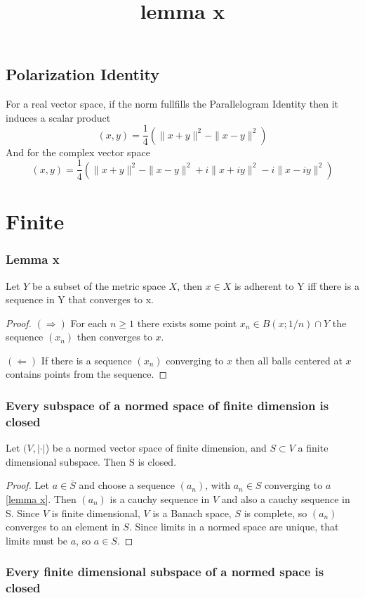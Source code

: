\documentclass[titlepage]{article}
\begin{document}
\subsection{Polarization Identity}
For a real vector space, if the norm fullfills the Parallelogram Identity then it induces a scalar product
\begin{equation}
(x,y) = \frac{1}{4}\left(\|x+y\|^2 - \|x-y\|^2\right)
\label{polreel}
\end{equation}
And for the complex vector space
\begin{equation}
(x,y) = \frac{1}{4}\left(\|x+y\|^2 - \|x-y\|^2 +i\|x+iy\|^2 - i\|x-iy\|^2   \right)
\label{polcomp}
\end{equation}
\section{Finite}
\subsubsection{Lemma x}
Let $Y$ be a subset of the metric space $X$, then $x\in X$ is adherent to Y iff there is a sequence in Y that converges to x.
\begin{proof}
\title{lemma x}
$(\Rightarrow)$ For each $n\geq 1$ there exists some point $x_n \in B(x;1/n)\cap Y$ the sequence $(x_n)$ then converges to $x$.

$(\Leftarrow)$  If there is a sequence $(x_n)$ converging to $x$ then all balls centered at $x$ contains points from the sequence.
\end{proof}
\subsubsection{Every subspace of a normed space of finite dimension is closed}
Let $(V, |\cdot|$) be a normed vector space of finite dimension, and $S\subset V$ a finite dimensional subspace. Then S is closed.
\begin{proof}
Let $a\in \overline{S}$ and choose a sequence $(a_n)$, with $a_n \in S$ converging to $a$ \ref{lemma x}. Then $(a_n)$ is a cauchy sequence in $V$ and also a cauchy sequence in S. Since $V$ is finite dimensional, $V$ is a Banach space, $S$ is complete, so $(a_n)$ converges to an element in $S$. Since limits in a normed space are unique, that limits must be $a$, so $a\in S$.
\end{proof}
\subsubsection{Every finite dimensional subspace of a normed space is closed}
\end{document}
